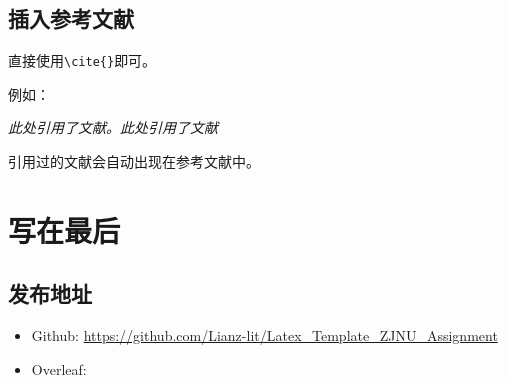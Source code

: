 \documentclass[12pt,hyperref,a4paper,UTF8]{ctexart}
\begin{document}
%
%
%
%
%
%

\subsection{插入参考文献}
直接使用\verb|\cite{}|即可。

例如：


   \textit{ 此处引用了文献\cite{0Isaac}。此处引用了文献\cite{2016The}}


引用过的文献会自动出现在参考文献中。

\section{写在最后}
\subsection{发布地址}
\begin{itemize}
    \item Github: \url{https://github.com/Lianz-lit/Latex_Template_ZJNU_Assignment}
    \item Overleaf:  \url{}
\end{itemize}


\end{document}
